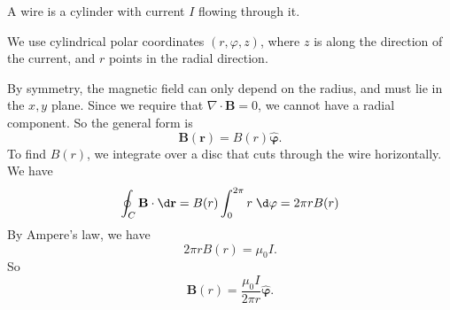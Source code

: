 \documentclass[a4paper]{article}
\begin{document}
\begin{eg}
  A wire is a cylinder with current $I$ flowing through it.

  We use cylindrical polar coordinates $(r, \varphi, z)$, where $z$ is along the direction of the current, and $r$ points in the radial direction.
  \begin{center}
  \end{center}
  By symmetry, the magnetic field can only depend on the radius, and must lie in the $x,y$ plane. Since we require that $\nabla\cdot \mathbf{B} = 0$, we cannot have a radial component. So the general form is
  \[
    \mathbf{B}(\mathbf{r}) = B(r)\hat{\boldsymbol\varphi}.
  \]
  To find $B(r)$, we integrate over a disc that cuts through the wire horizontally. We have
  \[
    \oint_C \mathbf{B}\cdot \d \mathbf{r} = B(r)\int_0^{2\pi} r\;\d \varphi = 2\pi r B(r)
  \]
  By Ampere's law, we have
  \[
    2\pi rB(r) = \mu_0 I.
  \]
  So
  \[
    \mathbf{B}(r) = \frac{\mu_0 I}{2\pi r} \hat{\boldsymbol\varphi}.
  \]
\end{eg}
\end{document}
